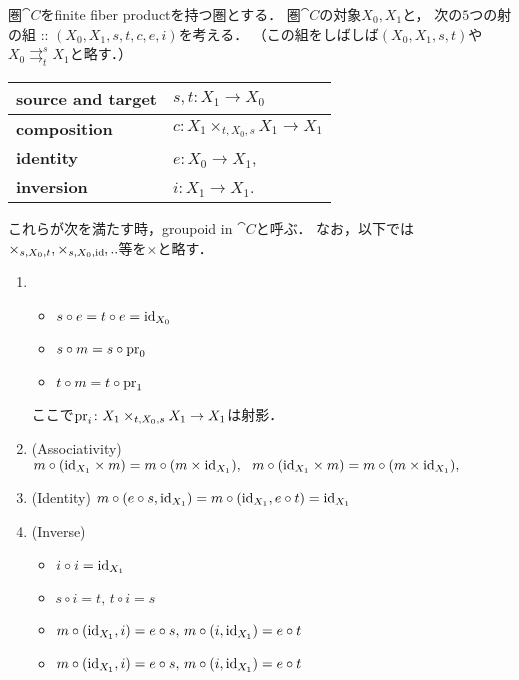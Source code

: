 \documentclass[a4paper, dvipdfmx]{jsarticle}
\newcommand{\parto}[2]{\mathrel{\mathop{\rightrightarrows}^{#1}_{#2}}}
\begin{document}
\begin{Def}
    圏$\cat{C}$をfinite fiber productを持つ圏とする．
    圏$\cat{C}$の対象$X_0, X_1$と，
    次の$5$つの射の組 :: $(X_0,X_1, s,t,c,e,i)$を考える．
    （この組をしばしば$(X_0,X_1,s,t)$や$X_0 \parto{s}{t} X_1$と略す．）
    \begin{center}
    \begin{tabular}{ll}
        \textbf{source and target} & $s,t \colon X_1 \to X_0$ \\ \hline
        \textbf{composition}       & $c \colon X_1 \times_{t,X_0,s} X_1 \to X_1$ \\ \hline
        \textbf{identity}          & $e \colon X_0 \to X_1$, \\ \hline
        \textbf{inversion}         & $i \colon X_1 \to X_1$.
    \end{tabular}
    \end{center}

    これらが次を満たす時，groupoid in $\cat{C}$と呼ぶ．
    なお，以下では$\times_{s,X_0, t}, \times_{s, X_0, \id},..$等を$\times$と略す．
    \begin{enumerate}[label=(\Alph*)]
    \item 
        \begin{itemize}
            \item $s\circ e=t\circ e=\id[X_0]$
            \item $s\circ m=s\circ \pr_{0}$
            \item $t\circ m=t\circ \pr_{1}$
        \end{itemize}
        ここで$\pr_i \colon X_1\times _{t,X_0,s} X_1\to X_1$は射影．
    \item
        (Associativity)
        $m\circ (\id[X_1]\times m)=m\circ (m\times \id[X_1]),\ \ 
        m\circ (\id[X_1]\times m)=m\circ (m\times \id[X_1]),$
    \item
        (Identity)
        $m\circ (e\circ s,\id[X_1])=m\circ (\id[X_1],e\circ t)=\id[X_1]$
    \item
        (Inverse)
        \begin{itemize}
            \item $i\circ i=\id[X_1]$
            \item $s\circ i=t,\,t\circ i=s$
            \item $m\circ (\id[X_1],i)=e\circ s,\,m\circ (i,\id[X_1])=e\circ t$
            \item $m\circ (\id[X_1],i)=e\circ s,\,m\circ (i,\id[X_1])=e\circ t$
        \end{itemize}
    \end{enumerate}
\end{Def}
\end{document}
